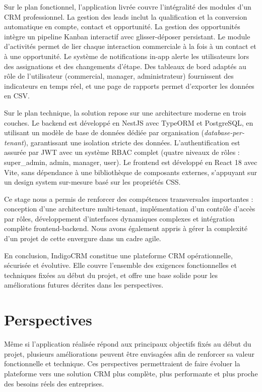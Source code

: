 \documentclass[12pt,a4paper,twoside,openany]{book}
\begin{document}
Sur le plan fonctionnel, l’application livrée couvre l’intégralité des modules d’un CRM professionnel. La gestion des leads inclut la qualification et la conversion automatique en compte, contact et opportunité. La gestion des opportunités intègre un pipeline Kanban interactif avec glisser-déposer persistant. Le module d’activités permet de lier chaque interaction commerciale à la fois à un contact et à une opportunité. Le système de notifications in-app alerte les utilisateurs lors des assignations et des changements d’étape. Des tableaux de bord adaptés au rôle de l’utilisateur (commercial, manager, administrateur) fournissent des indicateurs en temps réel, et une page de rapports permet d’exporter les données en CSV.

Sur le plan technique, la solution repose sur une architecture moderne en trois couches. Le backend est développé en NestJS avec TypeORM et PostgreSQL, en utilisant un modèle de base de données dédiée par organisation (\textit{database-per-tenant}), garantissant une isolation stricte des données. L’authentification est assurée par JWT avec un système RBAC complet (quatre niveaux de rôles : super\_admin, admin, manager, user). Le frontend est développé en React 18 avec Vite, sans dépendance à une bibliothèque de composants externes, s’appuyant sur un design system sur-mesure basé sur les propriétés CSS.

Ce stage nous a permis de renforcer des compétences transversales importantes : conception d’une architecture multi-tenant, implémentation d’un contrôle d’accès par rôles, développement d’interfaces dynamiques complexes et intégration complète frontend-backend. Nous avons également appris à gérer la complexité d’un projet de cette envergure dans un cadre agile.

En conclusion, IndigoCRM constitue une plateforme CRM opérationnelle, sécurisée et évolutive. Elle couvre l’ensemble des exigences fonctionnelles et techniques fixées au début du projet, et offre une base solide pour les améliorations futures décrites dans les perspectives.
\chapter*{Perspectives}

Même si l’application réalisée répond aux principaux objectifs fixés au début du projet, plusieurs améliorations peuvent être envisagées afin de renforcer sa valeur fonctionnelle et technique. Ces perspectives permettraient de faire évoluer la plateforme vers une solution CRM plus complète, plus performante et plus proche des besoins réels des entreprises.
\end{document}
